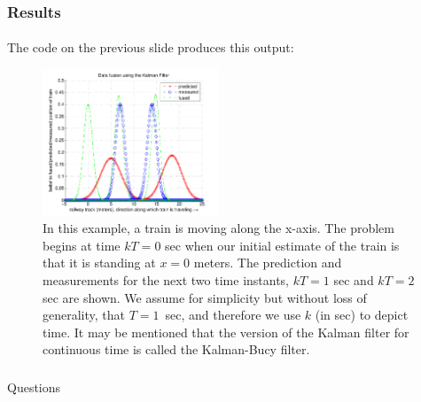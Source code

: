 \begin{frame}\pw\Large
\frametitle{Results}
\framesubtitle{}
The code on the previous slide produces this output:
\begin{figure}[h]
\centering
\includegraphics[width=0.47\textwidth]{figs/CONTROLS_Kalman_train_example.pdf}
\caption{\tiny In this example, a train is moving along the x-axis.  The problem begins at time $kT=0$ sec when our initial estimate of the train is that it is standing at $x=0$ meters.  The prediction and measurements for the next two time instants, $kT=1$ sec and $kT=2$ sec are shown.  We assume for simplicity but without loss of generality, that $T=1$~sec, and therefore we use $k$ (in sec) to depict time.  It may be mentioned that the version of the Kalman filter for continuous time is called the Kalman-Bucy filter.}
\end{figure}
\end{frame}


\appendix
\begin{frame}\pw\Large
\frametitle{}
\framesubtitle{}
Questions
\end{frame}



